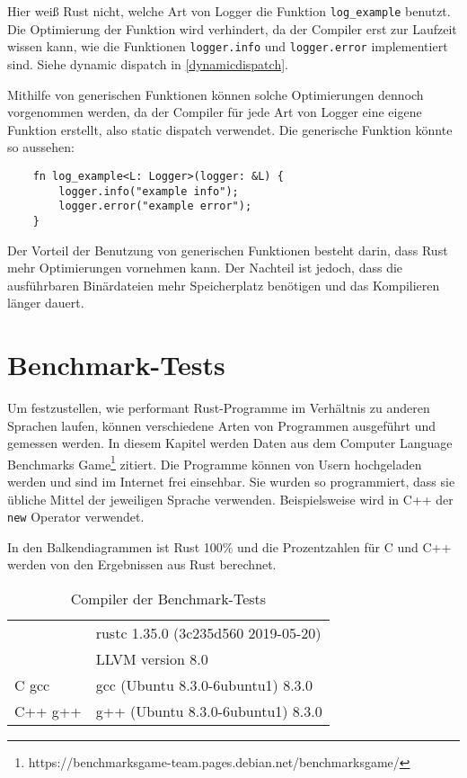 Hier weiß Rust nicht, welche Art von Logger die Funktion \verb"log_example" benutzt. Die Optimierung der Funktion wird verhindert, da der Compiler erst zur Laufzeit wissen kann, wie die Funktionen \verb"logger.info" und \verb"logger.error" implementiert sind. Siehe \glqq dynamic dispatch\grqq{} in \autoref{dynamicdispatch}.

Mithilfe von generischen Funktionen können solche Optimierungen dennoch vorgenommen werden, da der Compiler für jede Art von Logger eine eigene Funktion erstellt, also \glqq static dispatch\grqq{} verwendet. Die generische Funktion könnte so aussehen:

\begin{lstlisting}
    fn log_example<L: Logger>(logger: &L) {
        logger.info("example info");
        logger.error("example error");
    }
\end{lstlisting}

Der Vorteil der Benutzung von generischen Funktionen besteht darin, dass Rust mehr Optimierungen vornehmen kann. Der Nachteil ist jedoch, dass die ausführbaren Binärdateien mehr Speicherplatz benötigen und das Kompilieren länger dauert.


\section{Benchmark-Tests}

Um festzustellen, wie performant Rust-Programme im Verhältnis zu anderen Spra\-chen laufen, können verschiedene Arten von Programmen ausgeführt und ge\-mes\-sen werden. In diesem Kapitel werden Daten aus dem Computer Language Benchmarks Game\footnote{https://benchmarksgame-team.pages.debian.net/benchmarksgame/} zitiert. Die Programme können von Usern hochgeladen werden und sind im Internet frei einsehbar. Sie wurden so programmiert, dass sie übliche Mittel der jeweiligen Sprache verwenden. Beispielsweise wird in C++ der \verb"new" Operator verwendet.

In den Balkendiagrammen ist Rust 100\% und die Prozentzahlen für C und C++ werden von den Ergebnissen aus Rust berechnet.

\hspace{1cm}

\begin{table}[htbp]
\centering
\begin{tabular}{|l|l|}
\hline
\rule[-1ex]{0pt}{2.5ex} \multirow{2}{*}{Rust} & rustc 1.35.0 (3c235d560 2019-05-20) \\ & LLVM version 8.0 \\
\hline
\rule[-1ex]{0pt}{2.5ex} C gcc & gcc (Ubuntu 8.3.0-6ubuntu1) 8.3.0 \\
\hline
\rule[-1ex]{0pt}{2.5ex} C++ g++ & g++ (Ubuntu 8.3.0-6ubuntu1) 8.3.0 \\
\hline
\end{tabular}
\caption{Compiler der Benchmark-Tests}
\end{table}

